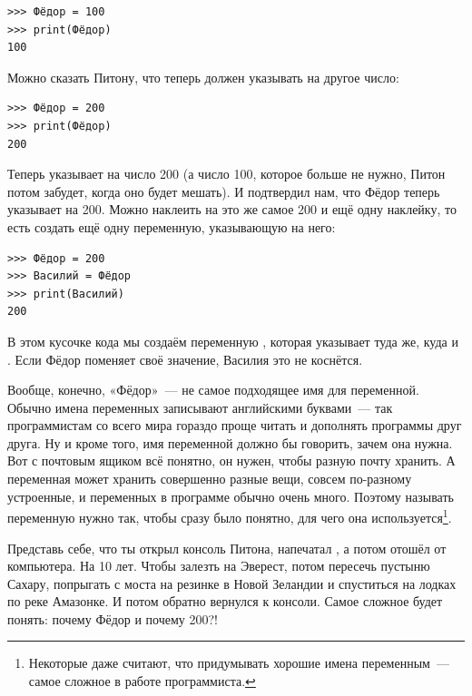 \begin{listing}
\begin{verbatim}
>>> Фёдор = 100
>>> print(Фёдор)
100
\end{verbatim}
\end{listing}

Можно сказать Питону, что  теперь должен указывать на другое число:

\begin{listing}
\begin{verbatim}
>>> Фёдор = 200
>>> print(Фёдор)
200
\end{verbatim}
\end{listing}

Теперь  указывает на число 200 (а число 100, которое больше не нужно, Питон потом забудет, когда оно будет мешать). И  подтвердил нам, что Фёдор теперь указывает на 200.
Можно наклеить на это же самое 200 и ещё одну наклейку, то есть создать ещё одну переменную, указывающую на него:

\begin{listing}
\begin{verbatim}
>>> Фёдор = 200
>>> Василий = Фёдор
>>> print(Василий)
200
\end{verbatim}
\end{listing}

В этом кусочке кода мы создаём переменную , которая указывает туда же, куда и . Если Фёдор поменяет своё значение, Василия это не коснётся.

Вообще, конечно, «Фёдор» — не самое подходящее имя для переменной. Обычно имена переменных записывают английскими буквами — так программистам со всего мира гораздо проще читать и дополнять программы друг друга. Ну и кроме того, имя переменной должно бы говорить, зачем она нужна. Вот с почтовым ящиком всё понятно, он нужен, чтобы разную почту хранить. А переменная может хранить совершенно разные вещи, совсем по-разному устроенные, и переменных в программе обычно очень много. Поэтому называть переменную нужно так, чтобы сразу было понятно, для чего она используется\footnote{Некоторые даже считают, что придумывать хорошие имена переменным — самое сложное в работе программиста.}.


Представь себе, что ты открыл консоль Питона, напечатал , а потом отошёл от компьютера. На 10 лет. Чтобы залезть на Эверест, потом пересечь пустыню Сахару, попрыгать с моста на резинке в Новой Зеландии и спуститься на лодках по реке Амазонке. И потом обратно вернулся к консоли. Самое сложное будет понять: почему Фёдор и почему 200?!

